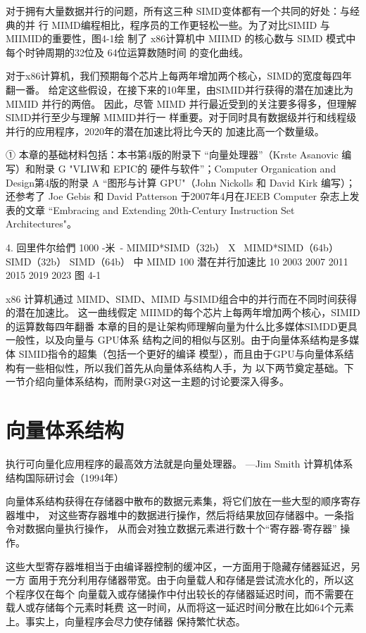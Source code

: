 对于拥有大量数据并行的问题，所有这三种 SIMD变体都有一个共同的好处：与经典的并
行 MIMD编程相比，程序员的工作更轻松一些。为了对比SIMID 与 MIIMID的重要性，图4-1绘
制了 x86计算机中 MIIMD 的核心数与 SIMD 模式中每个时钟周期的32位及 64位运算数随时间
的变化曲线。

对于x86计算机，我们预期每个芯片上每两年增加两个核心，SIMD的宽度每四年翻一番。
给定这些假设，在接下来的10年里，由SIMID并行获得的潜在加速比为MIMID 并行的两倍。
因此，尽管 MIMD 并行最近受到的关注要多得多，但理解 SIMD并行至少与理解 MIMID并行一
样重要。对于同时具有数据级并行和线程级并行的应用程序，2020年的潜在加速比将比今天的
加速比高一个数量级。

① 本章的基础材料包括：本书第4版的附录下 “向量处理器”（Krste Asanovic 编写）和附录 G "VLIW和 EPIC的
硬件与软件”；Computer Organication and Design第4版的附录 A “图形与计算 GPU"（John Nickolls 和 David Kirk
编写）；还参考了 Joe Gebis 和 David Patterson 于2007年4月在JEEB Computer 杂志上发表的文章 “Embracing and
Extending 20th-Century Instruction Set Architectures"。

4. 回里件尔给們
1000
-米~- MIMID*SIMD（32b）
X~ MIMD*SIMD（64b）
SIMD（32b）
SIMD（64b）
中 MIMD
100
潜在并行加速比
10
2003
2007
2011
2015
2019
2023
图 4-1

x86 计算机通过 MIMD、SIMD、MIMD 与SIMD组合中的并行而在不同时间获得的潜在加速比。
这一曲线假定 MIIMD的每个芯片上每两年增加两个核心，SIMID的运算数每四年翻番
本章的目的是让架构师理解向量为什么比多媒体SIMDD更具一般性，以及向量与 GPU体系
结构之间的相似与区别。由于向量体系结构是多媒体 SIMID指令的超集（包括一个更好的编译
模型），而且由于GPU与向量体系结构有一些相似性，所以我们首先从向量体系结构人手，为
以下两节奠定基础。下一节介绍向量体系结构，而附录G对这一主题的讨论要深入得多。
\section{向量体系结构}
执行可向量化应用程序的最高效方法就是向量处理器。
—Jim Smith
计算机体系结构国际研讨会（1994年）

向量体系结构获得在存储器中散布的数据元素集，将它们放在一些大型的顺序寄存器堆中，
对这些寄存器堆中的数据进行操作，然后将结果放回存储器中。一条指令对数据向量执行操作，
从而会对独立数据元素进行数十个“寄存器-寄存器” 操作。

这些大型寄存器堆相当于由编译器控制的缓冲区，一方面用于隐藏存储器延迟，另一方
面用于充分利用存储器带宽。由于向量载人和存储是尝试流水化的，所以这个程序仅在每个
向量载入或存储操作中付出较长的存储器延迟时间，而不需要在载人或存储每个元素时耗费
这一时间，从而将这一延迟时间分散在比如64个元素上。事实上，向量程序会尽力使存储器
保持繁忙状态。

